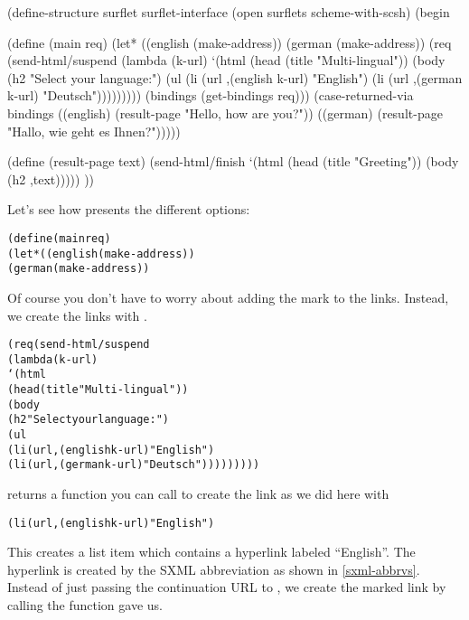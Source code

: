 \begin{listing}
(define-structure surflet surflet-interface
  (open surflets
        scheme-with-scsh)
  (begin

    (define (main req)
      (let* ((english (make-address))
             (german (make-address))
             (req (send-html/suspend
                   (lambda (k-url)
                     `(html 
                       (head (title "Multi-lingual"))
                       (body 
                        (h2 "Select your language:")
                        (ul
                         (li (url ,(english k-url) "English")
                         (li (url ,(german k-url) "Deutsch")))))))))
             (bindings (get-bindings req)))
        (case-returned-via bindings
          ((english) (result-page "Hello, how are you?"))
          ((german) (result-page "Hallo, wie geht es Ihnen?")))))

    (define (result-page text)
      (send-html/finish
       `(html 
         (head (title "Greeting"))
         (body
          (h2 ,text)))))
    ))
\end{listing}

Let's see how  presents the different options:

\begin{alltt}
    (define (main req)
      (let* ((english (make-address))
             (german (make-address))
\end{alltt}

Of course you don't have to worry about adding the mark to the links.
Instead, we create the links with .

\begin{alltt}
             (req (send-html/suspend
                   (lambda (k-url)
                     `(html 
                       (head (title "Multi-lingual"))
                       (body 
                        (h2 "Select your language:")
                        (ul
                         (li (url ,(english k-url) "English")
                         (li (url ,(german k-url) "Deutsch")))))))))
\end{alltt}

 returns a function you can call to create the
link as we did here with

\begin{alltt}
 (li (url ,(english k-url) "English")
\end{alltt}

This creates a list item which contains a hyperlink labeled
``English''.  The hyperlink is created by the SXML abbreviation
 as shown in \ref{sxml-abbrvs}.  Instead of just passing 
the continuation URL  to , we create the marked
link by calling the function  gave us.

